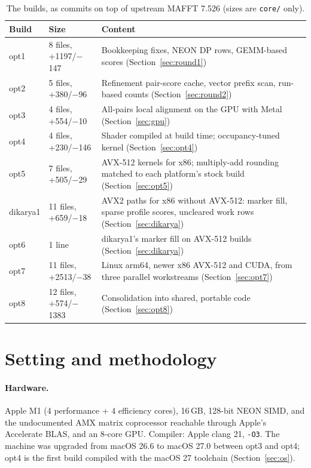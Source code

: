 \documentclass[11pt]{article}
\newcommand{\code}[1]{\texttt{#1}}
\begin{document}
\begin{table}[h]
\centering
\caption{The builds, as commits on top of upstream MAFFT 7.526 (sizes are \code{core/} only).}
\label{tab:builds}
\begin{tabularx}{\linewidth}{llX}
\toprule
Build & Size & Content \\
\midrule
opt1 & 8 files, +1197/$-$147 & Bookkeeping fixes, NEON DP rows, GEMM-based scores (Section~\ref{sec:round1}) \\
opt2 & 5 files, +380/$-$96 & Refinement pair-score cache, vector prefix scan, run-based counts (Section~\ref{sec:round2}) \\
opt3 & 4 files, +554/$-$10 & All-pairs local alignment on the GPU with Metal (Section~\ref{sec:gpu}) \\
opt4 & 4 files, +230/$-$146 & Shader compiled at build time; occupancy-tuned kernel (Section~\ref{sec:opt4}) \\
opt5 & 7 files, +505/$-$29 & AVX-512 kernels for x86; multiply-add rounding matched to each platform's stock build (Section~\ref{sec:opt5}) \\
dikarya1 & 11 files, +659/$-$18 & AVX2 paths for x86 without AVX-512: marker fill, sparse profile scores, uncleared work rows (Section~\ref{sec:dikarya}) \\
opt6 & 1 line & dikarya1's marker fill on AVX-512 builds (Section~\ref{sec:dikarya}) \\
opt7 & 11 files, +2513/$-$38 & Linux arm64, newer x86 AVX-512 and CUDA, from three parallel workstreams (Section~\ref{sec:opt7}) \\
opt8 & 12 files, +574/$-$1383 & Consolidation into shared, portable code (Section~\ref{sec:opt8}) \\
\bottomrule
\end{tabularx}
\end{table}

\section{Setting and methodology}

\paragraph{Hardware.} Apple M1 (4 performance + 4 efficiency cores), 16\,GB, 128-bit NEON
SIMD, and the undocumented AMX matrix coprocessor reachable through Apple's Accelerate
BLAS, and an 8-core GPU. Compiler: Apple clang 21, \code{-O3}. The machine was upgraded
from macOS 26.6 to macOS 27.0 between opt3 and opt4; opt4 is the first build compiled with
the macOS 27 toolchain (Section~\ref{sec:os}).
\end{document}
